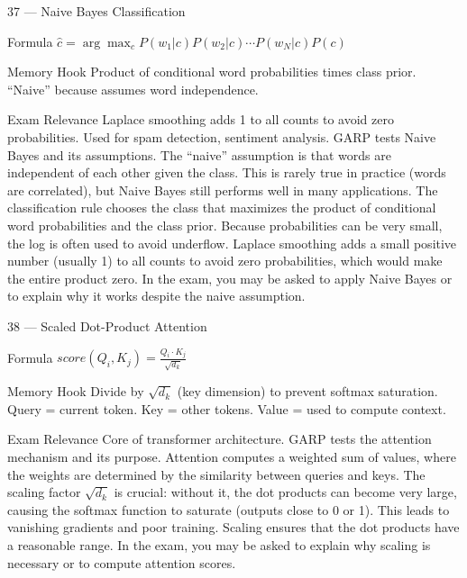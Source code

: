 \documentclass[aspectratio=169,8pt]{beamer}
\begin{document}
	\begin{frame}{37 --- Naive Bayes Classification}
		\begin{block}{Formula}
			$\hat{c} = \arg\max_c P(w_1|c)P(w_2|c)\cdots P(w_N|c)P(c)$
		\end{block}
		\begin{block}{Memory Hook}
			Product of conditional word probabilities times class prior. ``Naive'' because assumes word independence.
		\end{block}
		\begin{block}{Exam Relevance}
			Laplace smoothing adds 1 to all counts to avoid zero probabilities. Used for spam detection, sentiment analysis. GARP tests Naive Bayes and its assumptions. The ``naive'' assumption is that words are independent of each other given the class. This is rarely true in practice (words are correlated), but Naive Bayes still performs well in many applications. The classification rule chooses the class that maximizes the product of conditional word probabilities and the class prior. Because probabilities can be very small, the log is often used to avoid underflow. Laplace smoothing adds a small positive number (usually 1) to all counts to avoid zero probabilities, which would make the entire product zero. In the exam, you may be asked to apply Naive Bayes or to explain why it works despite the naive assumption.
		\end{block}
	\end{frame}
	
	\begin{frame}{38 --- Scaled Dot-Product Attention}
		\begin{block}{Formula}
			$score(Q_i, K_j) = \frac{Q_i \cdot K_j}{\sqrt{d_k}}$
		\end{block}
		\begin{block}{Memory Hook}
			Divide by $\sqrt{d_k}$ (key dimension) to prevent softmax saturation. Query = current token. Key = other tokens. Value = used to compute context.
		\end{block}
		\begin{block}{Exam Relevance}
			Core of transformer architecture. GARP tests the attention mechanism and its purpose. Attention computes a weighted sum of values, where the weights are determined by the similarity between queries and keys. The scaling factor $\sqrt{d_k}$ is crucial: without it, the dot products can become very large, causing the softmax function to saturate (outputs close to 0 or 1). This leads to vanishing gradients and poor training. Scaling ensures that the dot products have a reasonable range. In the exam, you may be asked to explain why scaling is necessary or to compute attention scores.
		\end{block}
	\end{frame}
	
\end{document}

